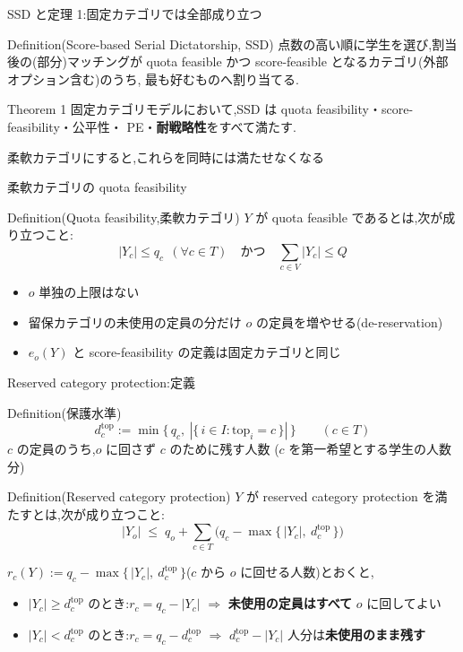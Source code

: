 \documentclass[aspectratio=43,11pt]{beamer}
\newcommand{\topf}{\mathrm{top}}
\newcommand{\dtop}[1]{d^{\topf}_{#1}}
\begin{document}
\begin{frame}{SSD と定理 1:固定カテゴリでは全部成り立つ}
\begin{block}{Definition(Score-based Serial Dictatorship, SSD)}
  点数の高い順に学生を選び,割当後の(部分)マッチングが
  quota feasible かつ score-feasible となるカテゴリ(外部オプション含む)のうち,
  最も好むものへ割り当てる.
\end{block}
\begin{block}{Theorem 1}
  固定カテゴリモデルにおいて,SSD は quota feasibility・score-feasibility・公平性・
  PE・\textbf{耐戦略性}をすべて満たす.
\end{block}
\medskip
\alert{柔軟カテゴリにすると,これらを同時には満たせなくなる}
\end{frame}

\begin{frame}{柔軟カテゴリの quota feasibility}
\begin{block}{Definition(Quota feasibility,柔軟カテゴリ)}
  $Y$ が quota feasible であるとは,次が成り立つこと:
  \[
    |Y_c| \leq q_c \ \ (\forall c \in T)
    \quad\text{かつ}\quad
    \sum_{c \in V} |Y_c| \leq Q
  \]
\end{block}
\begin{itemize}
  \item $o$ 単独の上限はない
  \item 留保カテゴリの未使用の定員の分だけ $o$ の定員を増やせる(de-reservation)
  \item $e_o(Y)$ と score-feasibility の定義は固定カテゴリと同じ
\end{itemize}
\medskip
\end{frame}

\begin{frame}{Reserved category protection:定義}
\small
\begin{block}{Definition(保護水準)}
  \[
    \dtop{c} := \min\bigl\{\, q_c,\ |\{\, i \in I : \topf_i = c \,\}| \,\bigr\}
    \qquad (c \in T)
  \]
  $c$ の定員のうち,$o$ に回さず $c$ のために残す人数
  ($c$ を第一希望とする学生の人数分)
\end{block}
\begin{block}{Definition(Reserved category protection)}
  $Y$ が reserved category protection を満たすとは,次が成り立つこと:
  \[
    |Y_o| \;\leq\; q_o + \sum_{c \in T} \bigl( q_c - \max\{\, |Y_c|,\ \dtop{c} \,\} \bigr)
  \]
\end{block}
$r_c(Y) := q_c - \max\{\, |Y_c|,\ \dtop{c} \,\}$($c$ から $o$ に回せる人数)とおくと,
\begin{itemize}
  \item $|Y_c| \geq \dtop{c}$ のとき:$r_c = q_c - |Y_c|$
        $\Rightarrow$ \textbf{未使用の定員はすべて} $o$ に回してよい
  \item $|Y_c| < \dtop{c}$ のとき:$r_c = q_c - \dtop{c}$
        $\Rightarrow$ $\dtop{c} - |Y_c|$ 人分は\textbf{未使用のまま残す}
\end{itemize}
\end{frame}
\end{document}
